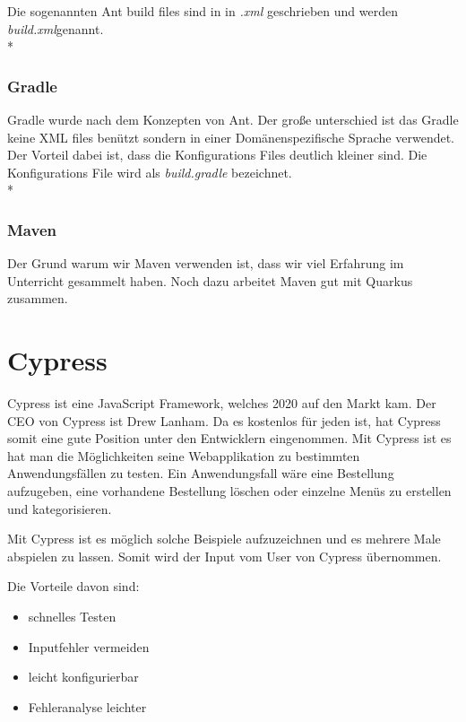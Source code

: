 Die sogenannten Ant build files sind in in \textit{.xml} geschrieben und werden \textit{build.xml}genannt. \\* \cite{MavenVsAntVsGradle}

\subsubsection{Gradle}

Gradle wurde nach dem Konzepten von Ant. Der große unterschied ist das Gradle keine XML files benützt sondern in einer Domänenspezifische Sprache verwendet.
Der Vorteil dabei ist, dass die Konfigurations Files deutlich kleiner sind. Die Konfigurations File wird als \textit{build.gradle} bezeichnet. \\*  \cite{MavenVsAntVsGradle}

\subsubsection{Maven}

Der Grund warum wir Maven verwenden ist, dass wir viel Erfahrung im Unterricht gesammelt haben. Noch dazu arbeitet Maven gut mit Quarkus zusammen. 

\section{Cypress}
\author{Bozidar Spasenovic}
\cite{Cypress-Docu}
Cypress ist eine JavaScript Framework, welches 2020 auf den Markt kam. Der CEO von Cypress ist Drew Lanham.
Da es kostenlos für jeden ist, hat Cypress somit eine gute Position unter den Entwicklern eingenommen.
Mit Cypress ist es hat man die Möglichkeiten seine Webapplikation zu bestimmten Anwendungsfällen zu testen.
Ein Anwendungsfall wäre eine Bestellung aufzugeben, eine vorhandene Bestellung löschen oder einzelne Menüs zu erstellen und kategorisieren.


Mit Cypress ist es möglich solche Beispiele aufzuzeichnen und es mehrere Male abspielen zu lassen. Somit wird der Input vom User 
von Cypress übernommen. 

Die Vorteile davon sind:
\begin{itemize}
    \item schnelles Testen
    \item Inputfehler vermeiden
    \item leicht konfigurierbar
    \item Fehleranalyse leichter
\end{itemize}

